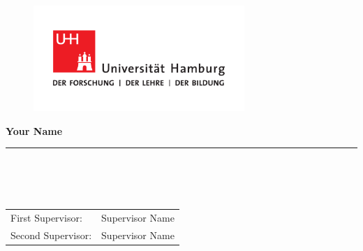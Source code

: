 \begin{titlepage}

  \setcounter{page}{-1}

	\begin{figure}[h]
		\begin{minipage}[b]{62mm}
			\includegraphics[width=80mm]{layout/UHH/up-uhh-logo-u-2010-u-farbe-u-cmyk-modus.pdf}
		\end{minipage}
		\hspace{4cm}
	\end{figure}

	\vfill
	
	\begin{center}
		\vspace{14mm}
        {\makeatletter
		\noindent \textbf{\huge\@title}
        \makeatother}
		\vspace{60mm}	
	\end{center}
	
	\vfill
	
	\noindent \textbf{Your Name} \\
	\noindent \rule{\textwidth}{0.4mm} 
 
	 \\
     \\
     \\
    

\noindent\begin{tabular}{@{}ll}
First Supervisor: & Supervisor Name \\
Second Supervisor: & Supervisor Name \\
\end{tabular}



\newpage


\end{titlepage}
